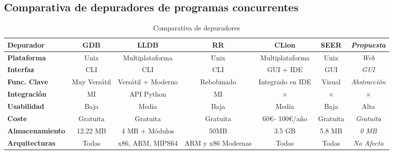 \subsection{Comparativa de depuradores de programas concurrentes}{\label{subsec:comparativa-depuradores-concurrentes}}

\begin{table}[htb]
    \begin{adjustbox}{max width=\textwidth}  %
        \begin{threeparttable}[htb]
            \begin{tabular}{lcccccc}
                \toprule
                \textbf{Depurador} & GDB & LLDB & RR & CLion & SEER & \textit{Propuesta} \\ \hline
                \textbf{Plataforma}      & Unix     & Multiplataforma & Unix     & Multiplataforma & Unix       & \textit{Web}        \\
                \textbf{Interfaz}        & CLI      & CLI             & CLI      & GUI + IDE       & GUI        & \textit{GUI}        \\
                \textbf{Func. Clave}     & Muy Versátil     & Versátil + Moderno           & Rebobinado     & Integrado en IDE           & Visual      & \textit{Abstracción} \\
                \textbf{Integración}     & MI    & API Python            & MI    & $\times$            & $\times$       & $\times$ \\              
                \textbf{Usabilidad}      & Baja     & Media      & Baja     & Media      & Baja      & Alta       \\
                \textbf{Coste}           & Gratuita & Gratuita        & Gratuita & 60\euro - 100\euro/año   & Gratuita   & \textit{Gratuita}   \\
                \textbf{Almacenamiento}  & 12.22 MB & 4 MB + Módulos  & 50MB     & 3.5 GB          & 5.8 MB     & \textit{0 MB}       \\
                \textbf{Arquitecturas}   & Todas & x86, ARM, MIPS64  & ARM y x86 Modernas     & Todas          & Todas     & \textit{No Afecta}       \\ \bottomrule
            \end{tabular}
        \end{threeparttable}
    \end{adjustbox}
    \caption{Comparativa de depuradores}
    \label{tab:comparativa-depuradores}
\end{table}

